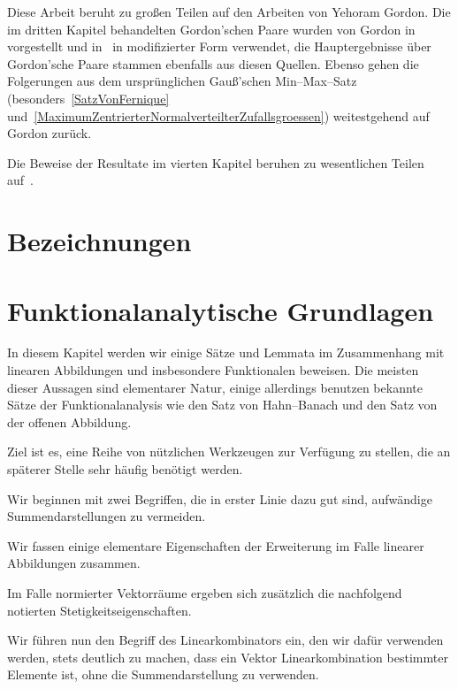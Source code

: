 \documentclass[a4paper]{report}
\numberwithin[\roman]{equation}{sat}
\begin{document}
Diese Arbeit beruht zu großen Teilen auf den Arbeiten von Yehoram Gordon.
Die im dritten Kapitel behandelten Gordon'schen Paare wurden von Gordon
in~\cite{Gor} vorgestellt und in~\cite{Gor2} in modifizierter Form verwendet,
die Hauptergebnisse über Gordon'sche Paare stammen ebenfalls aus diesen
Quellen.
Ebenso gehen die Folgerungen aus dem ursprünglichen Gauß'schen
Min--Max--Satz (besonders~\ref{SatzVonFernique} und~\ref{MaximumZentrierterNormalverteilterZufallsgroessen}) weitestgehend auf
Gordon zurück.

Die Beweise der Resultate im vierten Kapitel beruhen zu wesentlichen Teilen auf~\cite{Gor2, Gor, Gued}.

\newpage
\setcounter{chapter}{-1}
\chapter{Bezeichnungen}
\label{ch:bezeichnungen}



\chapter{Funktionalanalytische Grundlagen}
\label{ch:kapitel1}

In diesem Kapitel werden wir einige Sätze und Lemmata im Zusammenhang mit
linearen Abbildungen und insbesondere Funktionalen beweisen.
Die meisten dieser Aussagen sind elementarer Natur, einige allerdings benutzen bekannte Sätze der
Funktionalanalysis wie den Satz von Hahn--Banach und den Satz von der offenen
Abbildung.

Ziel ist es, eine Reihe von nützlichen Werkzeugen zur Verfügung zu stellen, die
an späterer Stelle sehr häufig benötigt werden.

Wir beginnen mit zwei Begriffen, die in erster Linie dazu gut sind, aufwändige
Summendarstellungen zu vermeiden.


\parag
Wir fassen einige elementare Eigenschaften der Erweiterung im Falle linearer
Abbildungen zusammen.


\parag
Im Falle normierter Vektorräume ergeben sich zusätzlich die nachfolgend
notierten Stetigkeitseigenschaften.


\parag
Wir führen nun den Begriff des Linearkombinators ein, den wir dafür verwenden
werden, stets deutlich zu machen, dass ein Vektor Linearkombination bestimmter
Elemente ist, ohne die Summendarstellung zu verwenden.
\end{document}
